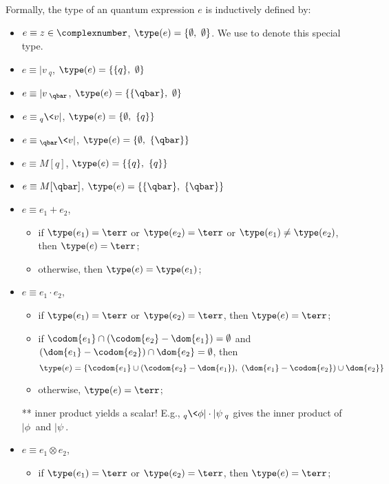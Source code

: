     \begin{definition}
        Formally, the type of an quantum expression $e$ is inductively defined by:
        \begin{itemize}
            \item $e\equiv z\in \complexnumber$, $\type(e) = \{\emptyset,\ \emptyset\}$. We use \scalar to denote this special type.
            \item $e\equiv |v\>_q$, $\type(e) = \{\{q\},\ \emptyset\}$
            \item $e\equiv |v\>_{\qbar}$, $\type(e) = \{\{\qbar\},\ \emptyset\}$
            \item $e\equiv {}_q\<v|$, $\type(e) = \{\emptyset,\  \{q\}\}$
            \item $e\equiv {}_{\qbar}\<v|$, $\type(e) = \{\emptyset,\ \{\qbar\}\}$
            \item $e\equiv M[q]$, $\type(e) = \{\{q\},\  \{q\}\}$
            \item $e\equiv M[\qbar]$, $\type(e) = \{\{\qbar\},\ \{\qbar\}\}$
            \item $e\equiv e_1+e_2$, 
            \begin{itemize}
                \item if $\type(e_1) = \terr$ or $\type(e_2) = \terr$ or $\type(e_1) \neq \type(e_2)$, then $\type(e) = \terr$;
                \item otherwise, then $\type(e) = \type(e_1)$;
            \end{itemize}
            \item $e\equiv e_1\cdot e_2$, 
            \begin{itemize}
                \item if $\type(e_1) = \terr$ or $\type(e_2) = \terr$, then $\type(e) = \terr$;
                \item if $\codom{e_1}\cap(\codom{e_2}-\dom{e_1}) = \emptyset$ and $(\dom{e_1}-\codom{e_2})\cap \dom{e_2} = \emptyset$, then 
                    $$\type(e) = \{\codom{e_1}\cup(\codom{e_2}-\dom{e_1}),\  (\dom{e_1}-\codom{e_2})\cup \dom{e_2}\}$$
                \item otherwise, $\type(e) = \terr$;
            \end{itemize}
            ** inner product yields a scalar! E.g., ${}_q\<\phi|\cdot|\psi\>_{q}$ gives the inner product of $|\phi\>$ and $|\psi\>$.
            \item $e\equiv e_1\otimes e_2$, 
            \begin{itemize}
                \item if $\type(e_1) = \terr$ or $\type(e_2) = \terr$, then $\type(e) = \terr$;

\end{itemize}
\end{itemize}
\end{definition}
